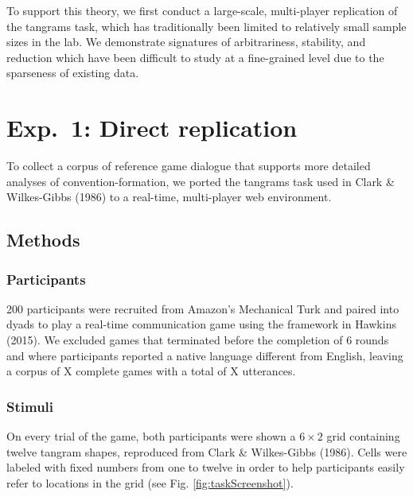 \documentclass[manuscript]{stjour}
\begin{document}
To support this theory, we first conduct a large-scale, multi-player
replication of the tangrams task, which has traditionally been limited
to relatively small sample sizes in the lab. We demonstrate signatures
of arbitrariness, stability, and reduction which have been difficult to
study at a fine-grained level due to the sparseness of existing data.

\section{Exp.~1: Direct replication}\label{replication-of-tangrams-task}

To collect a corpus of reference game dialogue that supports more
detailed analyses of convention-formation, we ported the tangrams task
used in Clark \& Wilkes-Gibbs (1986) to a real-time, multi-player web
environment.

\subsection{Methods}\label{methods}

\subsubsection{Participants}\label{participants}

200 participants were recruited from Amazon's Mechanical Turk and paired
into dyads to play a real-time communication game using the framework in
Hawkins (2015). We excluded games that terminated before the completion
of 6 rounds and where participants reported a native language different
from English, leaving a corpus of X complete games with a total of
X utterances.

\subsubsection{Stimuli}\label{stimuli}

On every trial of the game, both participants were shown a
\(6 \times 2\) grid containing twelve tangram shapes, reproduced from
Clark \& Wilkes-Gibbs (1986). Cells were labeled with fixed numbers from
one to twelve in order to help participants easily refer to locations in
the grid (see Fig. \ref{fig:taskScreenshot}).
\end{document}
